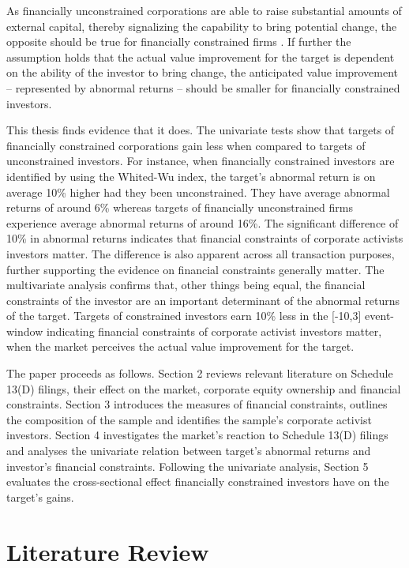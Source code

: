 \documentclass[12pt]{article}
\begin{document}
As financially unconstrained corporations are able to raise substantial amounts of external capital, thereby signalizing the capability to bring potential change, the opposite should be true for financially constrained firms \citep[p.1]{Farre-mensa2013}. If further the assumption holds that the actual value improvement for the target is dependent on the ability of the investor to bring change, the anticipated value improvement -- represented by abnormal returns -- should be smaller for financially constrained investors.\par 
This thesis finds evidence that it does. The univariate tests show that targets of financially constrained corporations gain less when compared to targets of unconstrained investors. For instance, when financially constrained investors are identified by using the Whited-Wu index, the target's abnormal return is on average 10\% higher had they been unconstrained. They have average abnormal returns of around 6\% whereas targets of financially unconstrained firms experience average abnormal returns of around 16\%. The significant difference of 10\% in abnormal returns indicates that financial constraints of corporate activists investors matter. The difference is also apparent across all transaction purposes, further supporting the evidence on financial constraints generally matter. The multivariate analysis confirms that, other things being equal, the financial constraints of the investor are an important determinant of the abnormal returns of the target. Targets of constrained investors earn 10\% less in the [-10,3] event-window indicating financial constraints of corporate activist investors matter, when the market perceives the actual value improvement for the target.\par
The paper proceeds as follows. Section 2 reviews relevant literature on Schedule 13(D) filings, their effect on the market, corporate equity ownership and financial constraints. Section 3 introduces the measures of financial constraints, outlines the composition of the sample and identifies the sample's corporate activist investors. Section 4 investigates the market's reaction to Schedule 13(D) filings and analyses the univariate relation between target's abnormal returns and investor's financial constraints. Following the univariate analysis, Section 5 evaluates the cross-sectional effect financially constrained investors have on the target's gains.

\section{Literature Review}
\end{document}
